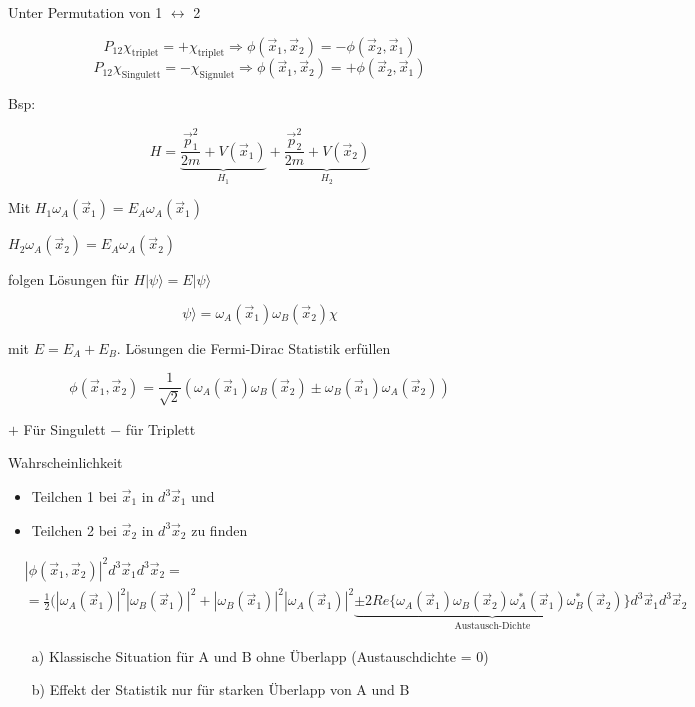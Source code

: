 Unter Permutation von 1 \(\leftrightarrow \) 2

\[P_{12}\chi_{\text{triplet}}= +\chi_{\text{triplet}} \Rightarrow \phi(\vec x_1,\vec x_2) = -\phi(\vec x_2,\vec x_1)\]
\[P_{12}\chi_{\text{Singulett}}= -\chi_{\text{Signulet}} \Rightarrow \phi(\vec x_1,\vec x_2) = +\phi(\vec x_2,\vec x_1)\]

Bsp:

\[H = \underbrace{\frac{\vec p_1^2}{2m}+V(\vec x_1)}_{H_1}+ \underbrace{\frac{\vec p_2^2}{2m}+V(\vec x_2)}_{H_2} \]

Mit \(H_{1}\omega_A(\vec x_1) = E_A\omega_A(\vec x_1)\)

\(H_{2}\omega_A(\vec x_2) = E_A\omega_A(\vec x_2)\)

folgen Lösungen für \(H|\psi\rangle =E|\psi\rangle \)

\[\psi\rangle = \omega_A(\vec x_1) \omega_B(\vec x_2) \chi\]

mit \(E= E_A+E_B\). Lösungen die Fermi-Dirac Statistik erfüllen

\[\phi(\vec x_1,\vec x_2) = \frac{1}{\sqrt{2}}(\omega_A(\vec x_1) \omega_B(\vec x_2) \pm \omega_B(\vec x_1) \omega_A(\vec x_2)) \]

\(+\) Für Singulett \(-\) für Triplett

Wahrscheinlichkeit

\begin{itemize}
\item Teilchen 1 bei \(\vec x_1\) in \(d^3\vec x_1\) und
\item Teilchen 2 bei \(\vec x_2\) in \(d^3\vec x_2\) zu finden
\end{itemize}


\begin{align}
&|\phi(\vec x_1,\vec x_2)|^2 d^3\vec x_1 d^3\vec x_2 =\\
&= \frac{1}{2}(|\omega_A(\vec x_1)|^2|\omega_B(\vec x_1)|^2+|\omega_B(\vec x_1)|^2|\omega_A(\vec x_1)|^2 \underbrace{ \pm 2Re\{\omega_A(\vec x_1) \omega_B(\vec x_2)\omega_A^*(\vec x_1) \omega_B^*(\vec x_2) \}}_{\text{Austausch-Dichte}}d^3\vec x_1d^3\vec x_2
\end{align}

\begin{enumerate}
\item[a)] Klassische Situation für A und B ohne Überlapp (Austauschdichte = 0)
\item[b)] Effekt der Statistik nur für starken Überlapp von A und B
\end{enumerate}


